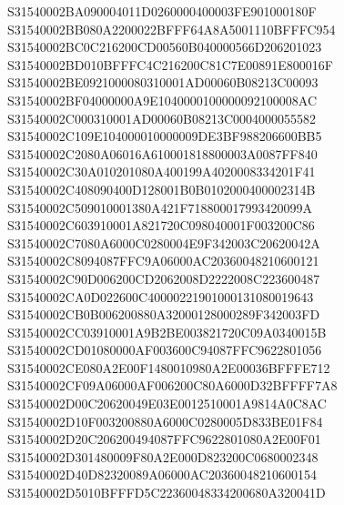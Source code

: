 \documentclass[12pt,a4paper]{article}
\begin{document}
\begin{framed}
{S31540002BA090004011D0260000400003FE901000180F\newline
S31540002BB080A2200022BFFF64A8A5001110BFFFC954\newline
S31540002BC0C216200CD00560B040000566D206201023\newline
S31540002BD010BFFFC4C216200C81C7E00891E800016F\newline
S31540002BE0921000080310001AD00060B08213C00093\newline
S31540002BF04000000A9E1040000100000092100008AC\newline
S31540002C000310001AD00060B08213C0004000055582\newline
S31540002C109E104000010000009DE3BF988206600BB5\newline
S31540002C2080A06016A610001818800003A0087FF840\newline
S31540002C30A010201080A400199A4020008334201F41\newline
S31540002C408090400D128001B0B0102000400002314B\newline
S31540002C509010001380A421F718800017993420099A\newline
S31540002C603910001A821720C098040001F003200C86\newline
S31540002C7080A6000C0280004E9F342003C20620042A\newline
S31540002C8094087FFC9A06000AC20360048210600121\newline
S31540002C90D006200CD2062008D2222008C223600487\newline
S31540002CA0D022600C40000221901000131080019643\newline
S31540002CB0B006200880A32000128000289F342003FD\newline
S31540002CC03910001A9B2BE003821720C09A0340015B\newline
S31540002CD01080000AF003600C94087FFC9622801056\newline
S31540002CE080A2E00F1480010980A2E00036BFFFE712\newline
S31540002CF09A06000AF006200C80A6000D32BFFFF7A8\newline
S31540002D00C20620049E03E0012510001A9814A0C8AC\newline
S31540002D10F003200880A6000C0280005D833BE01F84\newline
S31540002D20C206200494087FFC9622801080A2E00F01\newline
S31540002D301480009F80A2E000D823200C0680002348\newline
S31540002D40D82320089A06000AC20360048210600154\newline
S31540002D5010BFFFD5C22360048334200680A320041D\newline
}
\end{framed}
\end{document}
